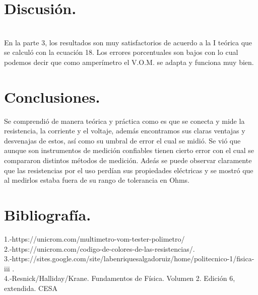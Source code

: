 \documentclass[11pt,a4paper]{article}
\begin{document}
\section*{Discusi\'{o}n.}\\
En la parte 3, los resultados son muy satisfactorios de acuerdo a la I te\'{o}rica que se calcul\'{o} con la ecuaci\'{o}n 18. Los errores porcentuales son bajos con lo cual podemos decir que como amper\'{i}metro el V.O.M. se adapta y funciona muy bien.


\section{Conclusiones.}
Se comprendi\'{o} de manera te\'{o}rica y pr\'{a}ctica como es que se conecta y mide la resistencia, la corriente y el voltaje, adem\'{a}s encontramos sus claras ventajas y desvenajas de estos, as\'{i} como su umbral de error el cual se midi\'{o}. Se vi\'{o} que aunque son instrumentos de medici\'{o}n confiables tienen cierto error con el cual se compararon distintos m\'{e}todos de medici\'{o}n. Ade\'{a}s se puede observar claramente que las resistencias por el uso perd\'{i}an sus propiedades el\'{e}ctricas y se mostr\'{o} que al medirlos estaba fuera de su rango de tolerancia en Ohms. 
 \section{Bibliograf\'{i}a.}
1.-https://unicrom.com/multimetro-vom-tester-polimetro/\\
2.-https://unicrom.com/codigo-de-colores-de-las-resistencias/.\\
3.-https://sites.google.com/site/labenriquesalgadoruiz/home/politecnico-1/fisica-iii .\\
4.-Resnick/Halliday/Krane. Fundamentos de F\'{i}sica. Volumen 2. Edici\'{o}n 6, extendida. CESA\\

\end{document}
